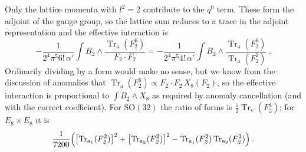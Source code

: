 \noindent Only the lattice momenta with $l^2 = 2$ contribute to the $q^0$ term. These form the adjoint of the gauge group, so the lattice sum reduces to a trace in the adjoint representation and the effective interaction is
\begin{equation}
	-\frac{1}{2^4\pi^5 6!\,\alpha'}\int B_{\textit{2}}\wedge \frac{\operatorname{Tr}_{\mathrm{a}}(F_{\textit{2}}^6)}{F_{\textit{2}}\cdot F_{\textit{2}}} = -\frac{1}{2^4\pi^5 4!\,\alpha'}\int B_{\textit{2}}\wedge \frac{\operatorname{Tr}_{\mathrm{a}}(F_{\textit{2}}^6)}{\operatorname{Tr}_{\mathrm{a}}(F_{\textit{2}}^2)} \:. \label{12.6.21}
\end{equation}
Ordinarily dividing by a form would make no sense, but we know from the discussion of anomalies that $\operatorname{Tr}_{\mathrm{a}}(F_{\textit{2}}^6) \propto F_{\textit{2}}\cdot F_{\textit{2}}\,X_8(F_{\textit{2}})$, so the effective interaction is proportional to $\int B_{\textit{2}}\wedge X_8$ as required by anomaly cancellation (and with the correct coefficient). For $\mathrm{SO}(32)$ the ratio of forms is $\frac{1}{2}\operatorname{Tr}_{\mathrm{v}}(F_{\textit{2}}^4)$; for $E_8\times E_8$ it is
\begin{equation}
	\frac{1}{7200}\Bigl(\bigl[\operatorname{Tr}_{\mathrm{a}_1}(F_{\textit{2}}^2)\bigr]^2 + \bigl[\operatorname{Tr}_{\mathrm{a}_2}(F_{\textit{2}}^2)\bigr]^2 - \operatorname{Tr}_{\mathrm{a}_1}(F_{\textit{2}}^2)\operatorname{Tr}_{\mathrm{a}_2}(F_{\textit{2}}^2)\Bigr) \:. \label{12.6.22}
\end{equation}

